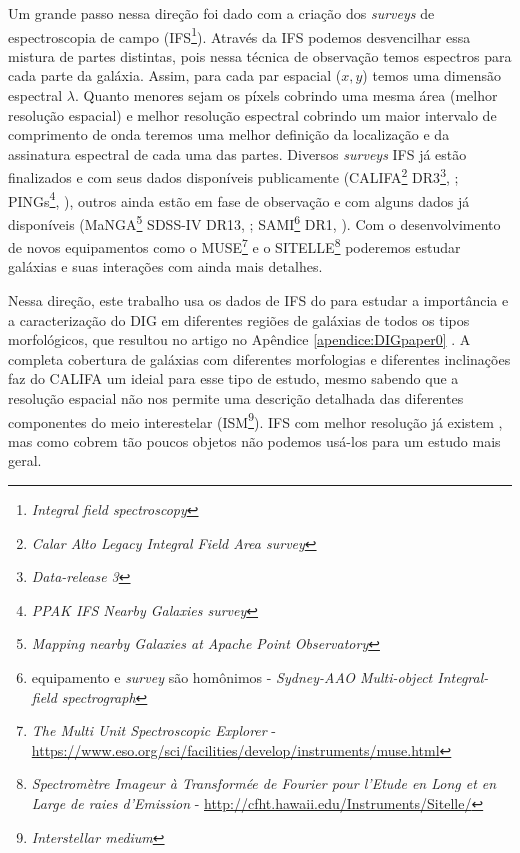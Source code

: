 Um grande passo nessa direção foi dado com a criação dos {\em surveys} de espectroscopia de campo (IFS\footnote{{\em Integral field spectroscopy}}). Através da IFS podemos desvencilhar essa mistura de partes distintas, pois nessa técnica de observação temos espectros para cada parte da galáxia. Assim, para cada par espacial ($x,y$) temos uma dimensão espectral $\lambda$. Quanto menores sejam os píxels cobrindo uma mesma área (melhor resolução espacial) e melhor resolução espectral cobrindo um maior intervalo de comprimento de onda teremos uma melhor definição da localização e da assinatura espectral de cada uma das partes. Diversos {\em surveys} IFS já estão finalizados e com seus dados disponíveis publicamente (CALIFA\footnote{\em Calar Alto Legacy Integral Field Area survey} DR3\footnote{\em Data-release 3}, \citealt{SFSanchez.DR3.2016}; PINGs\footnote{\em PPAK IFS Nearby Galaxies survey}, \citealt{RosalesOrtega.etal.2010}), outros ainda estão em fase de observação e com alguns dados já disponíveis (MaNGA\footnote{\em Mapping nearby Galaxies at Apache Point Observatory} SDSS-IV DR13, \citealt{MaNGADR1.2017}; SAMI\footnote{equipamento e {\em survey} são homônimos - {\em Sydney-AAO Multi-object Integral-field spectrograph}} DR1, \citealt{SAMIDR1.2017}). Com o desenvolvimento de novos equipamentos como o MUSE\footnote{{\em The Multi Unit Spectroscopic Explorer} - \href{https://www.eso.org/sci/facilities/develop/instruments/muse.html}{https://www.eso.org/sci/facilities/develop/instruments/muse.html}} e o SITELLE\footnote{{\em Spectromètre Imageur à Transformée de Fourier pour l'Etude en Long et en Large de raies d'Emission} - \href{http://cfht.hawaii.edu/Instruments/Sitelle/}{http://cfht.hawaii.edu/Instruments/Sitelle/}} poderemos estudar galáxias e suas interações com ainda mais detalhes.

Nessa direção, este trabalho usa os dados de IFS do \CALS para estudar a importância e a caracterização do DIG em diferentes regiões de galáxias de todos os tipos morfológicos, que resultou no artigo no Apêndice \ref{apendice:DIGpaper0} \citep{Lacerda.etal.2018}. A completa cobertura de galáxias com diferentes morfologias e diferentes inclinações faz do CALIFA um {\survey} ideial para esse tipo de estudo, mesmo sabendo que a resolução espacial não nos permite uma descrição detalhada das diferentes componentes do meio interestelar (ISM\footnote{\em Interstellar medium}). IFS com melhor resolução já existem \citep{Sanchez.etal.2015MUSE, Vogt.etal.2017a, RousseauNepton.etal.2017}, mas como cobrem tão poucos objetos não podemos usá-los para um estudo mais geral.


